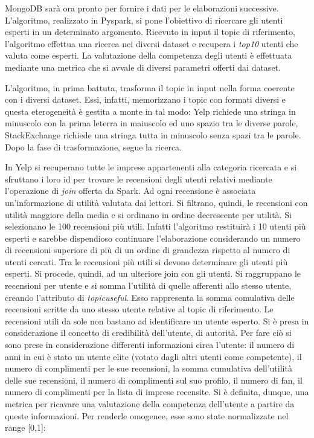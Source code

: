 MongoDB sarà ora pronto per fornire i dati per le elaborazioni successive. L'algoritmo, realizzato in Pyspark, si pone l'obiettivo di ricercare gli utenti esperti in un determinato argomento. Ricevuto in input il topic di riferimento, l'algoritmo effettua una ricerca nei diversi dataset e recupera i \emph{top10} utenti che valuta come esperti. La valutazione della competenza degli utenti è effettuata mediante una metrica che si avvale di diversi parametri offerti dai dataset.\par
L'algoritmo, in prima battuta, trasforma il topic in input nella forma coerente con i diversi dataset. Essi, infatti, memorizzano i topic con formati diversi e questa eterogeneità è gestita a monte in tal modo: Yelp richiede una stringa in minuscolo con la prima leterra in maiuscolo ed uno spazio tra le diverse parole, StackExchange richiede una stringa tutta in minuscolo senza spazi tra le parole. Dopo la fase di trasformazione, segue la ricerca.\par 
In Yelp si recuperano tutte le imprese appartenenti alla categoria ricercata e si sfruttano i loro id per trovare le recensioni degli utenti relativi mediante l'operazione di \emph{join} offerta da Spark. Ad ogni recensione è associata un'informazione di utilità valutata dai lettori. Si filtrano, quindi, le recensioni con utilità maggiore della media e si ordinano in ordine decrescente per utilità. Si selezionano le 100 recensioni più utili. Infatti l'algoritmo restituirà i 10 utenti più esperti e sarebbe dispendioso continuare l'elaborazione considerando un numero di recensioni superiore di più di un ordine di grandezza rispetto al numero di utenti cercati. Tra le recensioni più utili si devono determinare gli utenti più esperti. Si procede, quindi, ad un ulteriore join con gli utenti. Si raggruppano le recensioni per utente e si somma l'utilità di quelle afferenti allo stesso utente, creando l'attributo di \emph{topicuseful}. Esso rappresenta la somma comulativa delle recensioni scritte da uno stesso utente relative al topic di riferimento. Le recensioni utili da sole non bastano ad identificare un utente esperto. Si è presa in considerazione il concetto di credibilità dell'utente, di autorità. Per fare ciò si sono prese in considerazione differenti informazioni circa l'utente: il numero di anni in cui è stato un utente elite (votato dagli altri utenti come competente), il numero di complimenti per le sue recensioni, la somma cumulativa dell'utilità delle sue recensioni, il numero di complimenti sul suo profilo, il numero di fan, il numero di complimenti per la lista di imprese recensite. Si è definita, dunque, una metrica per ricavare una valutazione della competenza dell'utente a partire da queste informazioni. Per renderle omogenee, esse sono state normalizzate nel range [0,1]:
